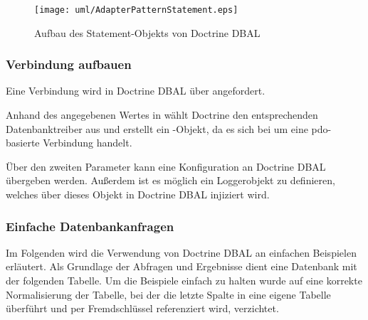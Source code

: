 \begin{figure}[H]
	\centering
	\texttt{[image: uml/AdapterPatternStatement.eps]}
	\caption{Aufbau des Statement-Objekts von Doctrine DBAL}
	\label{fig:adpaterPatternStatement}
\end{figure}

\subsubsection{Verbindung aufbauen}
\label{basics:doctrine:subsubsec:createConnection}
Eine Verbindung wird in Doctrine DBAL über  angefordert.

\begin{listing}[H]
\caption{}
\label{lst:DBALConnection}
\end{listing}

Anhand des angegebenen Wertes in  wählt Doctrine den entsprechenden Datenbanktreiber aus und erstellt ein -Objekt, da es sich bei  um eine \gls{pdo}-basierte Verbindung handelt.

Über den zweiten Parameter  kann eine Konfiguration an Doctrine DBAL übergeben werden. Außerdem ist es möglich ein Loggerobjekt zu definieren, welches über dieses Objekt in Doctrine DBAL injiziert wird.

\subsubsection{Einfache Datenbankanfragen}
\label{basics:doctrine:subsubsec:simpleDatabaseQueries}

Im Folgenden wird die Verwendung von Doctrine DBAL an einfachen Beispielen erläutert. Als Grundlage der Abfragen und Ergebnisse dient eine Datenbank mit der folgenden Tabelle. Um die Beispiele einfach zu halten wurde auf eine korrekte Normalisierung der Tabelle, bei der die letzte Spalte in eine eigene Tabelle überführt und per Fremdschlüssel referenziert wird, verzichtet.


